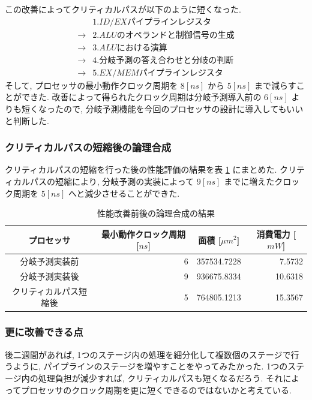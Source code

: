 \documentclass[../improvements.tex]{subfiles}
\begin{document}
  この改善によってクリティカルパスが以下のように短くなった. 
  \begin{displaymath}
    \begin{aligned}
      &1. ID/EX パイプラインレジスタ \\
      \rightarrow &2. ALU のオペランドと制御信号の生成 \\
      \rightarrow &3. ALU における演算 \\
      \rightarrow &4. 分岐予測の答え合わせと分岐の判断 \\
      \rightarrow &5. EX/MEM パイプラインレジスタ
    \end{aligned}
  \end{displaymath}
  そして, プロセッサの最小動作クロック周期を $8[ns]$ から $5[ns]$ まで減らすことができた.
  改善によって得られたクロック周期は分岐予測導入前の $6[ns]$ よりも短くなったので, 
  分岐予測機能を今回のプロセッサの設計に導入してもいいと判断した.

  \subsubsection{クリティカルパスの短縮後の論理合成}
  クリティカルパスの短縮を行った後の性能評価の結果を表 \ref{table:logic-synthesis-improved} にまとめた.
  クリティカルパスの短縮により, 分岐予測の実装によって $9[ns]$ までに増えたクロック周期を
  $5[ns]$ へと減少させることができた.

  \begin{table}[bp]
    \centering
    \begin{tabular}{|c|r|r|r|}
    \hline
    プロセッサ & \multicolumn{1}{c|}{最小動作クロック周期 {[}$ns${]}} & \multicolumn{1}{c|}{面積 {[}$\mu m^2${]}} & \multicolumn{1}{c|}{消費電力 {[}$mW${]}} \\ \hline
    分岐予測実装前 & 6 & 357534.7228 & 7.5732 \\
    分岐予測実装後 & 9 & 936675.8334 & 10.6318 \\
    クリティカルパス短縮後 & 5 & 764805.1213 & 15.3567 \\ \hline
    \end{tabular}
    \caption{性能改善前後の論理合成の結果}
    \label{table:logic-synthesis-improved}
  \end{table}

  \subsubsection{更に改善できる点}
  後二週間があれば, 1つのステージ内の処理を細分化して複数個のステージで行うように, 
  パイプラインのステージを増やすことをやってみたかった.
  1つのステージ内の処理負担が減少すれば, クリティカルパスも短くなるだろう.
  それによってプロセッサのクロック周期を更に短くできるのではないかと考えている.
\end{document}

